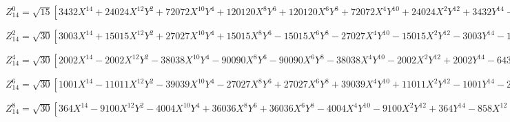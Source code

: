 \documentclass[10pt,landscape]{article}
\begin{document}
\vspace{1.2 mm}
\noindent $ Z^{0}_{14} = \sqrt{15} [3432X^{14} +24024X^{12}Y^{2} +72072X^{10}Y^{4} +120120X^{8}Y^{6} +120120X^{6}Y^{8} +72072X^{4}Y^{10} +24024X^{2}Y^{12} +3432Y^{14} -12012X^{12} -72072X^{10}Y^{2} -180180X^{8}Y^{4} -240240X^{6}Y^{6} -180180X^{4}Y^{8} -72072X^{2}Y^{10} -12012Y^{12} +16632X^{10} +83160X^{8}Y^{2} +166320X^{6}Y^{4} +166320X^{4}Y^{6} +83160X^{2}Y^{8} +16632Y^{10} -11550X^{8} -46200X^{6}Y^{2} -69300X^{4}Y^{4} -46200X^{2}Y^{6} -11550Y^{8} +4200X^{6} +12600X^{4}Y^{2} +12600X^{2}Y^{4} +4200Y^{6} -756X^{4} -1512X^{2}Y^{2} -756Y^{4} +56X^{2} +56Y^{2} -1] $

\vspace{1.2 mm}
\noindent $ Z^{2}_{14} = \sqrt{30} [3003X^{14} +15015X^{12}Y^{2} +27027X^{10}Y^{4} +15015X^{8}Y^{6} -15015X^{6}Y^{8} -27027X^{4}Y^{10} -15015X^{2}Y^{12} -3003Y^{14} -10296X^{12} -41184X^{10}Y^{2} -51480X^{8}Y^{4} +51480X^{4}Y^{8} +41184X^{2}Y^{10} +10296Y^{12} +13860X^{10} +41580X^{8}Y^{2} +27720X^{6}Y^{4} -27720X^{4}Y^{6} -41580X^{2}Y^{8} -13860Y^{10} -9240X^{8} -18480X^{6}Y^{2} +18480X^{2}Y^{6} +9240Y^{8} +3150X^{6} +3150X^{4}Y^{2} -3150X^{2}Y^{4} -3150Y^{6} -504X^{4} +504Y^{4} +28X^{2} -28Y^{2}] $

\vspace{1.2 mm}
\noindent $ Z^{4}_{14} = \sqrt{30} [2002X^{14} -2002X^{12}Y^{2} -38038X^{10}Y^{4} -90090X^{8}Y^{6} -90090X^{6}Y^{8} -38038X^{4}Y^{10} -2002X^{2}Y^{12} +2002Y^{14} -6435X^{12} +12870X^{10}Y^{2} +109395X^{8}Y^{4} +180180X^{6}Y^{6} +109395X^{4}Y^{8} +12870X^{2}Y^{10} -6435Y^{12} +7920X^{10} -23760X^{8}Y^{2} -110880X^{6}Y^{4} -110880X^{4}Y^{6} -23760X^{2}Y^{8} +7920Y^{10} -4620X^{8} +18480X^{6}Y^{2} +46200X^{4}Y^{4} +18480X^{2}Y^{6} -4620Y^{8} +1260X^{6} -6300X^{4}Y^{2} -6300X^{2}Y^{4} +1260Y^{6} -126X^{4} +756X^{2}Y^{2} -126Y^{4}] $

\vspace{1.2 mm}
\noindent $ Z^{6}_{14} = \sqrt{30} [1001X^{14} -11011X^{12}Y^{2} -39039X^{10}Y^{4} -27027X^{8}Y^{6} +27027X^{6}Y^{8} +39039X^{4}Y^{10} +11011X^{2}Y^{12} -1001Y^{14} -2860X^{12} +34320X^{10}Y^{2} +77220X^{8}Y^{4} -77220X^{4}Y^{8} -34320X^{2}Y^{10} +2860Y^{12} +2970X^{10} -38610X^{8}Y^{2} -41580X^{6}Y^{4} +41580X^{4}Y^{6} +38610X^{2}Y^{8} -2970Y^{10} -1320X^{8} +18480X^{6}Y^{2} -18480X^{2}Y^{6} +1320Y^{8} +210X^{6} -3150X^{4}Y^{2} +3150X^{2}Y^{4} -210Y^{6}] $

\vspace{1.2 mm}
\noindent $ Z^{8}_{14} = \sqrt{30} [364X^{14} -9100X^{12}Y^{2} -4004X^{10}Y^{4} +36036X^{8}Y^{6} +36036X^{6}Y^{8} -4004X^{4}Y^{10} -9100X^{2}Y^{12} +364Y^{14} -858X^{12} +22308X^{10}Y^{2} -12870X^{8}Y^{4} -72072X^{6}Y^{6} -12870X^{4}Y^{8} +22308X^{2}Y^{10} -858Y^{12} +660X^{10} -17820X^{8}Y^{2} +27720X^{6}Y^{4} +27720X^{4}Y^{6} -17820X^{2}Y^{8} +660Y^{10} -165X^{8} +4620X^{6}Y^{2} -11550X^{4}Y^{4} +4620X^{2}Y^{6} -165Y^{8}] $
\end{document}
